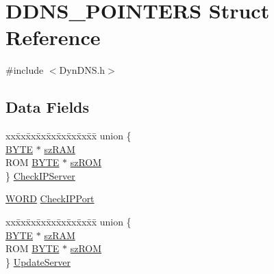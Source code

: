 \hypertarget{struct_d_d_n_s___p_o_i_n_t_e_r_s}{}\section{D\+D\+N\+S\+\_\+\+P\+O\+I\+N\+T\+E\+R\+S Struct Reference}
\label{struct_d_d_n_s___p_o_i_n_t_e_r_s}


{\ttfamily \#include $<$Dyn\+D\+N\+S.\+h$>$}

\subsection*{Data Fields}
\begin{DoxyCompactItemize}
\item 
\begin{tabbing}
xx\=xx\=xx\=xx\=xx\=xx\=xx\=xx\=xx\=\kill
union \{\\
\>\hyperlink{_generic_type_defs_8h_a4ae1dab0fb4b072a66584546209e7d58}{BYTE} $\ast$ \hyperlink{struct_d_d_n_s___p_o_i_n_t_e_r_s_af20edf4e2cc85ba124bb787233bbd660}{szRAM}\\
\>ROM \hyperlink{_generic_type_defs_8h_a4ae1dab0fb4b072a66584546209e7d58}{BYTE} $\ast$ \hyperlink{struct_d_d_n_s___p_o_i_n_t_e_r_s_a89a99439d03fb333aeb42a4f1ac93feb}{szROM}\\
\} \hyperlink{struct_d_d_n_s___p_o_i_n_t_e_r_s_ad06a39c4bb79dc88f8cc1ff63d9f96ca}{CheckIPServer}\\

\end{tabbing}\item 
\hyperlink{_generic_type_defs_8h_a2b0e863dadf920709ec53d9088ee7c91}{W\+O\+R\+D} \hyperlink{struct_d_d_n_s___p_o_i_n_t_e_r_s_af193117e65e79fc5b2276d5a87eeebb7}{Check\+I\+P\+Port}
\item 
\begin{tabbing}
xx\=xx\=xx\=xx\=xx\=xx\=xx\=xx\=xx\=\kill
union \{\\
\>\hyperlink{_generic_type_defs_8h_a4ae1dab0fb4b072a66584546209e7d58}{BYTE} $\ast$ \hyperlink{struct_d_d_n_s___p_o_i_n_t_e_r_s_af20edf4e2cc85ba124bb787233bbd660}{szRAM}\\
\>ROM \hyperlink{_generic_type_defs_8h_a4ae1dab0fb4b072a66584546209e7d58}{BYTE} $\ast$ \hyperlink{struct_d_d_n_s___p_o_i_n_t_e_r_s_a89a99439d03fb333aeb42a4f1ac93feb}{szROM}\\
\} \hyperlink{struct_d_d_n_s___p_o_i_n_t_e_r_s_a02e0a3fa3116732267f81e7ee44e2741}{UpdateServer}\\


\end{tabbing}
\end{DoxyCompactItemize}
